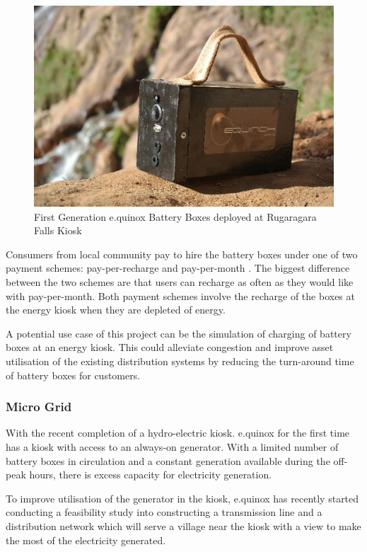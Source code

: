 \begin{figure}[h!]
\centering
\includegraphics[scale=0.7]{Images/AmaziBox.jpg}
\caption{First Generation e.quinox Battery Boxes deployed at Rugaragara Falls Kiosk}
\label{fig:AmaziBox}
\end{figure}

Consumers from local community pay to hire the battery boxes under one of two payment schemes: pay-per-recharge and pay-per-month \cite{e.quinox-Hydro-web:2012}. The biggest difference between the two schemes are that users can recharge as often as they would like with pay-per-month. Both payment schemes involve the recharge of the boxes at the energy kiosk when they are depleted of energy.

A potential use case of this project can be the simulation of charging of battery boxes at an energy kiosk. This could alleviate congestion and improve asset utilisation of the existing distribution systems by reducing the turn-around time of battery boxes for customers.

\subsubsection*{Micro Grid}
With the recent completion of a hydro-electric kiosk. e.quinox for the first time has a kiosk with access to an always-on generator. With a limited number of battery boxes in circulation and a constant generation available during the off-peak hours, there is excess capacity for electricity generation.

To improve utilisation of the generator in the kiosk, e.quinox has recently started conducting a feasibility study into constructing a transmission line and a distribution network which will serve a village near the kiosk with a view to make the most of the electricity generated.

